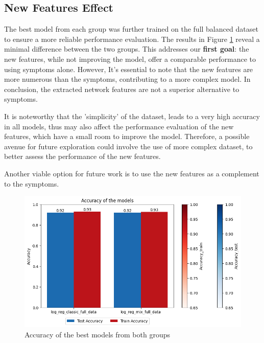 
\subsection{New Features Effect}

\noindent
The best model from each group was further trained on the full balanced dataset to ensure a more reliable 
performance evaluation. The results in Figure \ref{fig:acc_best_models} reveal a minimal difference between 
the two groups. This addresses our \textbf{first goal}: the new features, while not improving the model, 
offer a comparable performance to using symptoms alone. However, It's essential to note that the new features are 
more numerous than the symptoms, contributing to a more complex model. In conclusion, the extracted network 
features are not a superior alternative to symptoms. 

It is noteworthy that the 'simplicity' of the dataset, leads to a very high accuracy in all models, thus may also affect the performance
evaluation of the new features, which have a small room to improve the model. Therefore, a possible avenue
for future exploration could involve the use of more complex dataset, to better assess the performance of the
new features.

Another viable option for future work is to use the new features as a complement to the symptoms.




\begin{figure}[H]
	\centering
	\includegraphics[width=\columnwidth]{images/acc_best_models.png}
	\caption{Accuracy of the best models from both groups}
	\label{fig:acc_best_models}
\end{figure}



